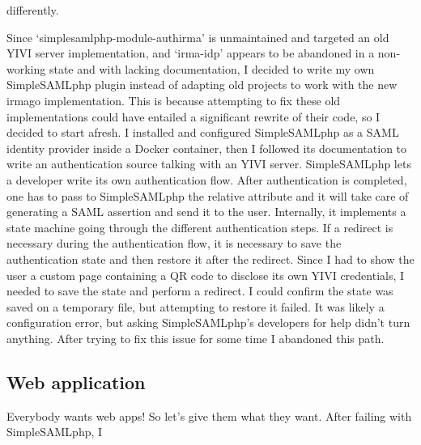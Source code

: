 \documentclass{report}
\begin{document}
differently. \par Since \enquote*{simplesamlphp-module-authirma} is unmaintained and targeted an old YIVI server implementation, and \enquote*{irma-idp} appears to be abandoned in
a non-working state and with lacking documentation, I decided to write my own SimpleSAMLphp plugin instead of adapting old projects to work with the new irmago implementation. This
is because attempting to fix these old implementations could have entailed a significant rewrite of their code, so I decided to start afresh. I installed and configured
SimpleSAMLphp \cite{simplesamlphp-docs} as a SAML identity provider \cite{sstc-saml-core-errata-2.0-wd-07} inside a Docker container, then I followed its documentation to write an
authentication source talking with an YIVI server.  SimpleSAMLphp lets a developer write its own authentication flow. After authentication is completed, one has to pass to
SimpleSAMLphp the relative attribute and it will take care of generating a SAML assertion and send it to the user. Internally, it implements a state machine going through the
different authentication steps. If a redirect is necessary during the authentication flow, it is necessary to save the authentication state and then restore it after the redirect.
Since I had to show the user a custom page containing a QR code to disclose its own YIVI credentials, I needed to save the state and perform a redirect. I could confirm the state
was saved on a temporary file, but attempting to restore it failed. It was likely a configuration error, but asking SimpleSAMLphp's developers for help didn't turn anything. After
trying to fix this issue for some time I abandoned this path.

\iffalse

\subsection{Web application}
Everybody wants web apps! So let's give them what they want. After failing with SimpleSAMLphp, I 
\end{document}
